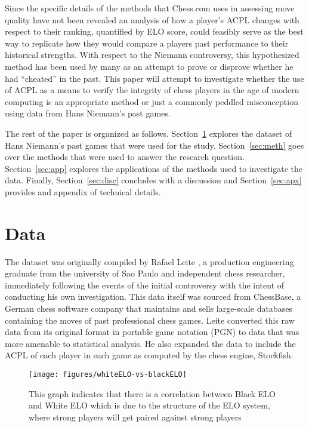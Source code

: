 \documentclass[12pt, letterpaper, titlepage]{article}
\begin{document}
Since the specific details of the methods that Chess.com uses in assessing move quality have not been revealed an analysis of how a player's ACPL changes with respect to their ranking, quantified by ELO score, could feasibly serve as the best way to replicate how they would compare a players past performance to their historical strengths. With respect to the Niemann controversy, this hypothesized method has been used by many \citet{medium2022} as an attempt to prove or disprove whether he had “cheated” in the past. This paper will attempt to investigate whether the use of ACPL as a means to verify the integrity of chess players in the age of modern computing is an appropriate method or just a commonly peddled misconception using data from Hans Niemann's past games.

The rest of the paper is organized as follows. Section~\ref{sec:data} explores the dataset of Hans Niemann's past games that were used for the study. Section~\ref{sec:meth} goes over the methods that were used to answer the research question. Section~\ref{sec:app} explores the applications of the methods used to investigate the data. Finally, Section~\ref{sec:disc} concludes with a discussion and Section~\ref{sec:apx} provides and appendix of technical details.

\section{Data}
\label{sec:data}

The dataset was originally compiled by Rafael Leite \citep{leite2022}, a production engineering graduate from the university of Sao Paulo and independent chess researcher, immediately following the events of the initial controversy with the intent of conducting his own investigation. This data \citep{chessbase} itself was sourced from ChessBase, a German chess software company that maintains and sells large-scale databases containing the moves of past professional chess games. Leite converted this raw data from its original format in portable game notation (PGN) to data that was more amenable to statistical analysis. He also expanded the data to include the ACPL of each player in each game as computed by the chess engine, Stockfish.

\begin{figure}[!htb]
    \centering
    \texttt{[image: figures/whiteELO-vs-blackELO]}
    \caption{This graph indicates that there is a correlation between Black ELO and White ELO which is due to the structure of the ELO system, where strong players will get paired against strong players}
    \label{fig:elo_lineplot}
\end{figure}
\end{document}
